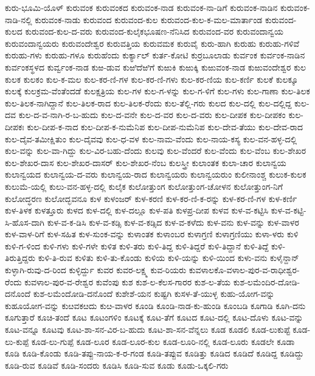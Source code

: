 ಕುರು-ಭೂಮಿ-ಯೊಳ್
ಕುರುವಂಕ
ಕುರುವಂಕದ
ಕುರುವಂಕ-ನಾಡ
ಕುರುವಂಕ-ನಾ-ಡಿಗೆ
ಕುರುವಂಕ-ನಾಡಿನ
ಕುರುವಂಕ-ನಾಡಿ-ನಲ್ಲಿ
ಕುರುವಂಕ-ನಾಡು
ಕುರುವಂದ
ಕುರುವಂದ-ಕುಲ
ಕುರುವಂದ-ಕುಲ-ಕ-ಮಲ-ಮಾರ್ತಾಂಡ
ಕುರುವಂದ-ಕುಲದ
ಕುರುವಂದ-ಕುಲ-ದ-ವರು
ಕುರುವಂದ-ಕುಲೈಕಭೂಷಣ-ನೆನಿಸಿದ
ಕುರುವಂದ-ವರ
ಕುರುವಂದಾನ್ವಯ
ಕುರುವಂದಾನ್ವಯರು
ಕುರುವಂದೇಶ್ವರ
ಕುರುವತ್ತಿಯ
ಕುರುವಮಕ
ಕುರುವೈ
ಕುರು-ಹಾಗಿ
ಕುರುಹು
ಕುರುಹು-ಗಳಿವೆ
ಕುರುಹು-ಗಳು
ಕುರುಹು-ಗಳೂ
ಕುರುಹೆಂದು
ಕುರ್ಕ್ಯಾಲ್
ಕುರ್ತ-ಕೋಟಿ
ಕುರ್ರಬೂಲಾಡು
ಕುರ್ವಂಕ
ಕುರ್ವಂಕ-ನಾಡಿನ
ಕುರ್ವಂಕಸ್ಥಳದ
ಕುರ್ವ್ವಂಕ-ನಾಡ
ಕುಱ-ಡುವ
ಕುಱಿದೆಱಿಗೆ
ಕುಱುಕಿ
ಕುಱುಕ್ಕಿ
ಕುಱುವಂಕ-ನಾಡ
ಕುಱುವಂದೇಶ್ವರ
ಕುಲ
ಕುಲಕ
ಕುಲಕಂ
ಕುಲ-ಕ-ಮಲ
ಕುಲ-ಕರ-ಣಿ-ಗಳ
ಕುಲ-ಕರ-ಣಿ-ಗಳು
ಕುಲ-ಕರ-ಣಿಯ
ಕುಲ-ಕರ್ಣಿ
ಕುಲಕೆ
ಕುಲಕ್ಕೂ
ಕುಲಕ್ಕೆ
ಕುಲಕ್ರಮ-ವೆಂತೆಂದಡೆ
ಕುಲಕ್ಷತ್ರಿಯ
ಕುಲ-ಗಳ
ಕುಲ-ಗ-ಳನ್ನು
ಕುಲ-ಗ-ಳಿಗೆ
ಕುಲ-ಗಳು
ಕುಲ-ಗಾಣಾ
ಕುಲ-ತಿಲಕ
ಕುಲ-ತಿಲಕ-ನಾಗಿದ್ದಾನೆ
ಕುಲ-ತಿಲಕ-ರಾದ
ಕುಲ-ತಿಲಕ-ರೆಂದು
ಕುಲ-ತೆಲ್ಲಿ-ಗರು
ಕುಲದ
ಕುಲ-ದಲ್ಲಿ
ಕುಲ-ದಲ್ಲಿದ್ದ
ಕುಲ-ದವ
ಕುಲ-ದ-ವ-ನಾಗಿ-ರ-ಬ-ಹುದು
ಕುಲ-ದ-ವನೇ
ಕುಲ-ದ-ವರ
ಕುಲ-ದ-ವರು
ಕುಲ-ದೀಪಕ
ಕುಲ-ದೀಪಕಂ
ಕುಲ-ದೀಪಕಃ
ಕುಲ-ದೀಪ-ಕ-ನಾದ
ಕುಲ-ದೀಪ-ಕ-ನುಮೆನಿಪ
ಕುಲ-ದೀಪ-ನುಮೆನಿಪ
ಕುಲ-ದೇವ-ತೆಯು
ಕುಲ-ದೇವ-ರಾದ
ಕುಲ-ದೈವ-ತಮೀಕ್ಷಿತುಂ
ಕುಲ-ದೈವವು
ಕುಲ-ಧ-ವಳ
ಕುಲ-ನಾಮ-ವೆಂದು
ಕುಲ-ನಾಯ-ಕಸ್ಯ
ಕುಲ-ವನ-ಹಳ್ಳ-ದಲ್ಲಿ
ಕುಲ-ವನ್ನು
ಕುಲ-ವಾ-ಗಿದ್ದು
ಕುಲ-ವಿರ-ಬಹು-ದೆಂದು
ಕುಲವು
ಕುಲ-ವೆಂದರೆ
ಕುಲ-ವೆಂದು
ಕುಲ-ವೆಂಬ
ಕುಲ-ಶೇಖರ
ಕುಲ-ಶೇಖರ-ದಾಸ
ಕುಲ-ಶೇಖರ-ದಾಸರ್
ಕುಲ-ಶೇಖರ-ನೆಂಬ
ಕುಲಸ್ತ್ರೀ
ಕುಲಾಂತಕ
ಕುಲಾ-ಚಾರ
ಕುಲಾನ್ವಯ
ಕುಲಾನ್ವಯದ
ಕುಲಾನ್ವಯ-ದ-ವರು
ಕುಲಾನ್ವಯ-ರಾದ
ಕುಲಾನ್ವಯರು
ಕುಲಾನ್ವಯರುಂ
ಕುಲೀನಾಂಶ್ಚ
ಕುಲುಕ-ಕುಲಕ
ಕುಲುಮೆ-ಯಲ್ಲಿ
ಕುಲು-ವನ-ಹಳ್ಳ-ದಲ್ಲಿ
ಕುಲೈಕ
ಕುಲೋತ್ತುಂಗ
ಕುಲೋತ್ತುಂಗ-ಚೋಳನ
ಕುಲೋತ್ತುಂಗ-ನಿಗೆ
ಕುಲೋದ್ಧರಣ
ಕುಲೋದ್ಭವನೂ
ಕುಳ
ಕುಳಂಜರ್
ಕುಳ-ಕರಣಿ
ಕುಳ-ಕರ-ಣಿ-ಕ-ರನ್ನು
ಕುಳ-ಕರ-ಣಿ-ಗಳ
ಕುಳ-ಕರ್ಣಿ
ಕುಳ-ತಿಳಕ
ಕುಳತ್ತೂರು
ಕುಳದ
ಕುಳ-ದಲ್ಲಿ
ಕುಳ-ದಲ್ಲೂ
ಕುಳ-ಪತಿ
ಕುಳಪ್ರ-ದೀಪ
ಕುಳವ
ಕುಳ-ವ-ಕಟ್ಟಿಸಿ
ಕುಳ-ವ-ಕಟ್ಟಿ-ಸಿ-ಹೊಸ-ದಾಗಿ
ಕುಳ-ವ-ಕ-ಡಿಸಿ
ಕುಳ-ವ-ಕಡ್ಸಿ
ಕುಳ-ವ-ಕಡ್ಸಿದ
ಕುಳ-ವ-ಕಳೆದು
ಕುಳ-ವನು
ಕುಳ-ವನ್ನು
ಕುಳ-ವಾಳರ
ಕುಳ-ವಾಳ-ರಿಗೆ
ಕುಳ-ಸಹಿತ
ಕುಳ-ಸುಂಕ-ವನ್ನು
ಕುಳಾಂತಕ
ಕುಳಾಂಬರ
ಕುಳಾಗ್ರಣಿ
ಕುಳಾಗ್ರಣಿಯು
ಕುಳಾ-ಳರು
ಕುಳಿ
ಕುಳಿ-ಗ-ಳಿಂದ
ಕುಳಿ-ಗಳು
ಕುಳಿ-ಗಳೇ
ಕುಳಿತ
ಕುಳಿ-ತರು
ಕುಳಿ-ತಿದ್ದ
ಕುಳಿ-ತಿದ್ದರೆ
ಕುಳಿ-ತಿದ್ದಾನೆ
ಕುಳಿ-ತಿದ್ದೆ
ಕುಳಿ-ತಿರುತ್ತಿದ್ದರು
ಕುಳಿ-ತಿ-ರುವ
ಕುಳಿತು
ಕುಳಿ-ತು-ಕೊಂಡು
ಕುಳಿಯ
ಕುಳಿ-ಯನ್ನು
ಕುಳಿ-ಯಿಂದ
ಕುಳು-ವನು
ಕುಳೈನ್ದಾನ್
ಕುಳ್ಳಾಗಿ-ರುವು-ದ-ರಿಂದ
ಕುಳ್ಳಿರ್ದ್ದು
ಕುವರ
ಕುವರ-ಲಕ್ಷ್ಮ
ಕುವ-ರಿಯರು
ಕುವಳಾಲಕೊ-ವಳಾಲ-ಪುರ-ವ-ರಾಧೀಶ್ವರ-ರೆಂದು
ಕುವಳಾಲ-ಪುರ-ವ-ರೇಶ್ವರ
ಕುವೆಂಪು
ಕುಶ
ಕುಶ-ಲ-ಕೆಲಸ-ಗಾರರ
ಕುಶ-ಲ-ತೆಯ
ಕುಶ-ಲಮೆಂದಿರ-ದೋಡಿ-ದನೊಂದೆ
ಕುಶ-ಲಮೆಂದೋಡಿ-ದನೊಂದೆ
ಕುಶೇಶೆ-ಯನ
ಕುಷ್ಟಗಿ
ಕುಸಳ-ತೆ-ಯುಳ್ಳ
ಕುಹು-ಯೋಗ-ವನ್ನು
ಕುಹೂಯೋಗ-ವನ್ನು
ಕುೞವಕೞದು
ಕುೞ-ವಾಳರ
ಕೂಂಡಿ
ಕೂಂಡಿ-ನಾಡ-ಕು-ಹುಂಡಿ
ಕೂಂಬಡಿ
ಕೂಗಾಡಿ
ಕೂಗಿ-ದನು
ಕೂಗುತ್ತಾರೆ
ಕೂಚಿ-ತಂದೆ
ಕೂಟ
ಕೂಟಂಗಳಿಂ
ಕೂಟಕ್ಕೆ
ಕೂಟ-ತೆಗೆ
ಕೂಟದ
ಕೂಟ-ದಲ್ಲಿ
ಕೂಟ-ದೊಳು
ಕೂಟ-ವನ್ನು
ಕೂಟ-ವನ್ನೂ
ಕೂಟವು
ಕೂಟ-ಶಾ-ಸನ-ವಿರ-ಬ-ಹುದು
ಕೂಟ-ಶಾ-ಸನ-ವೆನ್ನಲು
ಕೂಡ
ಕೂಡಲಿ
ಕೂಡ-ಲುಕುಪ್ಟೆ
ಕೂಡ-ಲು-ಕುಪ್ಪೆ
ಕೂಡ-ಲು-ಗುಪ್ಪೆ
ಕೂಡ-ಲೂರ
ಕೂಡ-ಲೂರ-ಕುಲ
ಕೂಡ-ಲೂರಿ-ನಲ್ಲಿ
ಕೂಡ-ಲೂರು
ಕೂಡಲೇ
ಕೂಡಾ
ಕೂಡಿ
ಕೂಡಿ-ಕೊಂಡು
ಕೂಡಿ-ತಪ್ಪು-ನಾಯ-ಕ-ರ-ಗಂಡ
ಕೂಡಿ-ತಪ್ಪುವ
ಕೂಡಿತ್ತು
ಕೂಡಿದ
ಕೂಡಿದೆ
ಕೂಡಿದ್ದ
ಕೂಡಿದ್ದು
ಕೂಡಿ-ರುವ
ಕೂಡಿವೆ
ಕೂಡಿ-ಸಂದರು
ಕೂಡಿಸಿ
ಕೂಡಿ-ಸುವ
ಕೂಡು
ಕೂಡು-ಒಕ್ಕಲಿ-ಗರು

